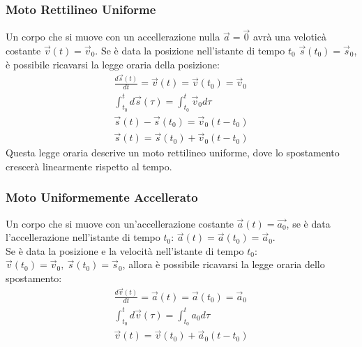 \documentclass{article}
\numberwithin{equation}{subsection}
\begin{document}
\subsubsection{Moto Rettilineo Uniforme}
Un corpo che si muove con un accellerazione nulla $\vec{a}=\vec{0}$ avrà 
una veloticà costante $\vec{v}(t)=\vec{v}_0$.
Se è data la posizione nell'istante di tempo $t_0$ $\vec{s}(t_0)=\vec{s}_0$, 
è possibile 
ricavarsi la legge oraria della posizione:
\begin{gather}
    \displaystyle\frac{d\vec{s}(t)}{dt}=\vec{v}(t)=\vec{v}(t_0)=\vec{v}_0\\
    \displaystyle\int_{t_0}^{t}d\vec{s}(\tau)=\int_{t_0}^{t}\vec{v}_0d\tau\\
    \vec{s}(t)-\vec{s}(t_0)=\vec{v}_0(t-t_0)\\
    \vec{s}(t)=\vec{s}(t_0)+\vec{v}_0(t-t_0)
\end{gather}
Questa legge oraria descrive un moto rettilineo uniforme, dove 
lo spostamento crescerà linearmente rispetto al tempo.

\begin{center}\end{center}

\subsubsection{Moto Uniformemente Accellerato}
Un corpo che si muove con un'accellerazione costante $\vec{a}(t)=\vec{a_0}$, 
se è data l'accellerazione nell'istante di tempo $t_0$: $\vec{a}(t)=\vec{a}(t_0)=\vec{a}_0$. \\
Se è data la posizione e la velocità nell'istante di tempo 
$t_0$: $\vec{v}(t_0)=\vec{v}_0{,}\:\vec{s}(t_0)=\vec{s}_0$, 
allora è possibile ricavarsi la legge oraria dello spostamento:
\begin{gather}
    \displaystyle\frac{d\vec{v}(t)}{dt}=\vec{a}(t)=\vec{a}(t_0)=\vec{a}_0\\
    \displaystyle\int_{t_0}^td\vec{v}(\tau)=\int_{t_0}^ta_0d\tau\\
    \vec{v}(t)=\vec{v}(t_0)+\vec{a}_0(t-t_0)
\end{gather}
\end{document}
